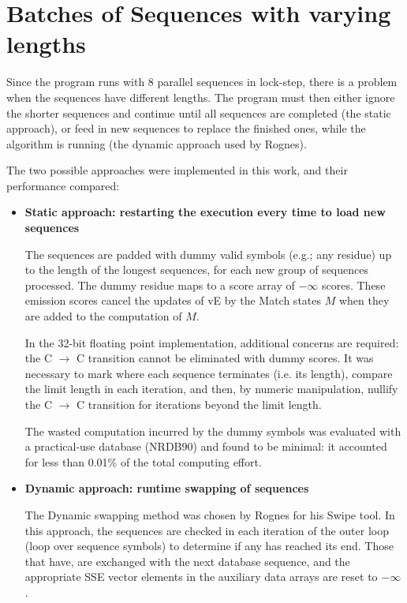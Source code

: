 \section{Batches of Sequences with varying lengths}

Since the program runs with 8 parallel sequences in lock-step, there is a problem when the sequences have different lengths. The program must then either ignore the shorter sequences and continue until all sequences are completed (the static approach), or feed in new sequences to replace the finished ones, while the algorithm is running (the dynamic approach used by Rognes). 

The two possible approaches were implemented in this work, and their performance compared:

\begin{itemize}

\item \textbf{ Static approach: restarting the execution every time to load new sequences }

The sequences are padded with dummy valid symbols (e.g.; any residue) up to the length of the longest sequences, for each new group of sequences processed. The dummy residue maps to a score array of $-\infty$ scores. These emission scores cancel the updates of vE by the Match states $M$ when they are added to the computation of $M$.

In the 32-bit floating point implementation, additional concerns are required: the C $\rightarrow$ C transition cannot be eliminated with dummy scores. It was necessary to mark where each sequence terminates (i.e. its length), compare the limit length in each iteration, and then, by numeric manipulation, nullify the C $\rightarrow$ C transition for iterations beyond the limit length.

The wasted computation incurred by the dummy symbols was evaluated with a practical-use database (NRDB90) and found to be minimal: it accounted for less than 0.01\% of the total computing effort.


\item \textbf{ Dynamic approach: runtime swapping of sequences }

The Dynamic swapping method was chosen by Rognes for his Swipe tool. In this approach, the sequences are checked in each iteration of the outer loop (loop over sequence symbols) to determine if any has reached its end. Those that have, are exchanged with the next database sequence, and the appropriate SSE vector elements in the auxiliary data arrays are reset to $-\infty$.

\end{itemize}


